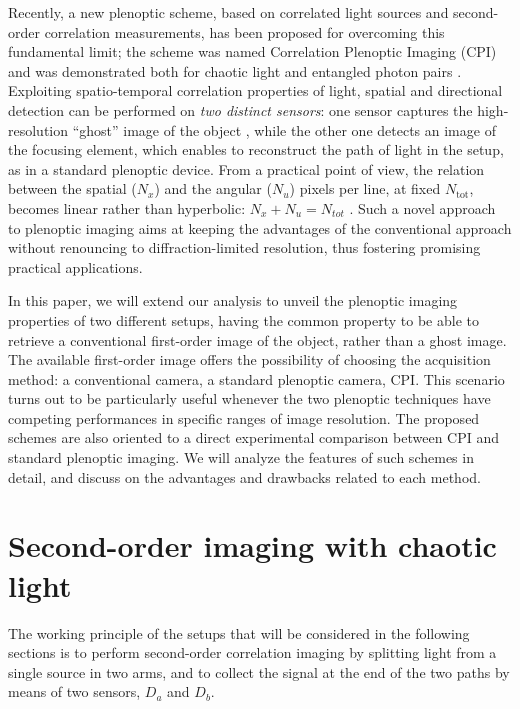 \documentclass[aps,pra,amssymb,twocolumn,amsmath,superscriptaddress,showpacs,10pt]{revtex4-1}
\begin{document}
Recently, a new plenoptic scheme, based on correlated light sources and second-order correlation measurements, has been proposed for overcoming this fundamental limit; the scheme was named Correlation Plenoptic Imaging (CPI) and was demonstrated both for chaotic light \cite{cpi_prl,cpi_qmqm} and entangled photon pairs \cite{cpi_technologies}. Exploiting spatio-temporal correlation properties of light, spatial and directional detection can be performed on \textit{two distinct sensors}: one sensor captures the high-resolution ``ghost'' image of the object \cite{pittman,gatti,laserphys,valencia,scarcelliPRL}, while the other one detects an image of the focusing element, which enables to reconstruct the path of light in the setup, as in a standard plenoptic device. From a practical point of view, the relation between the spatial ($N_x$) and the angular ($N_u$) pixels per line, at fixed $N_{\mathrm{tot}}$, becomes linear rather than hyperbolic: $N_x + N_u = N_{tot}$ \cite{cpi_prl}. Such a novel approach to plenoptic imaging aims at keeping the advantages of the conventional approach without renouncing to diffraction-limited resolution, thus fostering promising practical applications.

In this paper, we will extend our analysis to unveil the plenoptic imaging properties of two different setups, having the common property to be able to retrieve a conventional first-order image of the object, rather than a ghost image. The available first-order image offers the possibility of choosing the acquisition method: a conventional camera, a standard plenoptic camera, CPI. This scenario turns out to be particularly useful whenever the two plenoptic techniques have competing performances in specific ranges of image resolution. The proposed schemes are also oriented to a direct experimental comparison between CPI and standard plenoptic imaging. We will analyze the features of such schemes in detail, and discuss on the advantages and drawbacks related to each method.



\section{Second-order imaging with chaotic light}

The working principle of the setups that will be considered in the following sections is to perform second-order correlation imaging by splitting light from a single source in two arms, and to collect the signal at the end of the two paths by means of two sensors, $D_a$ and $D_b$.
\end{document}
